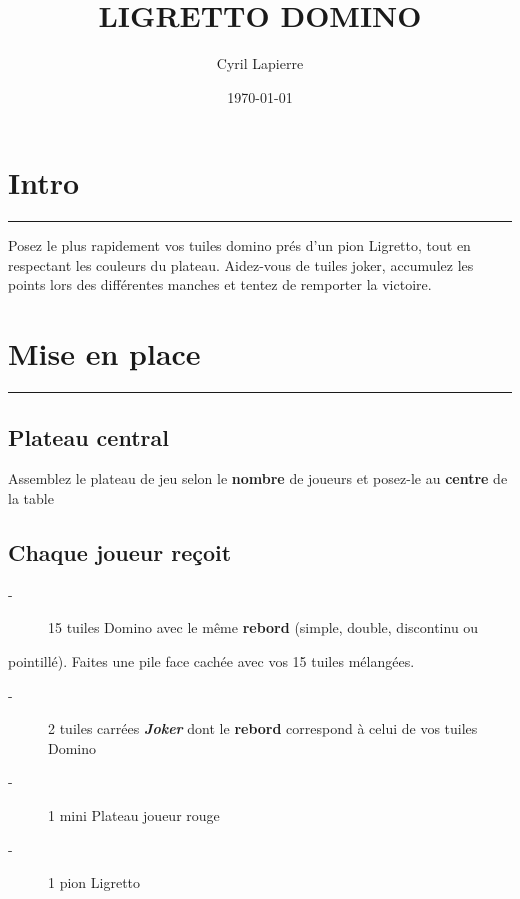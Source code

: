 \documentclass{article}%
\title{LIGRETTO DOMINO}%
\author{Cyril Lapierre}%
\date{\today}%
\begin{document}
%
\normalsize%
\maketitle\thispagestyle{header}%
\pagestyle{header}%
\sectionfont{\color{blue}}%
\subsectionfont{\color{blue}}%
\subsubsectionfont{\color{blue}}%
\section{ Intro
}%
\label{sec:Intro}%
\textcolor{blue}{\rule{18cm}{0.07cm}}\break%
Posez le plus rapidement vos tuiles domino prés d'un pion Ligretto, tout en respectant les couleurs du plateau. Aidez{-}vous de tuiles joker, accumulez les points lors des différentes manches et tentez de remporter la victoire.


%
\sectionfont{\color{mygreen}}%
\subsectionfont{\color{mygreen}}%
\subsubsectionfont{\color{mygreen}}%
\section{ Mise en place
}%
\label{sec:Miseenplace}%
\textcolor{mygreen}{\rule{18cm}{0.07cm}}\break

%
\subsection{ Plateau central
}%
\label{subsec:Plateaucentral}%
Assemblez le plateau de jeu selon le %
\textcolor{mygreen}{%
\textbf{nombre}%
}%
\textit{ }%
 de joueurs et posez{-}le au %
\textcolor{mygreen}{%
\textbf{centre}%
}%
\textit{ }%
 de la table


%
\subsection{ Chaque joueur reçoit
}%
\label{subsec:Chaquejoueurreoit}%
\begin{description}%
\item[{-} ]%
%
 15 tuiles Domino avec le même %
\textcolor{mygreen}{%
\textbf{rebord}%
}%
\textit{ }%
 (simple, double, discontinu ou
%
\end{description}%
pointillé). Faites une pile face cachée avec vos 15 tuiles mélangées.
%
\begin{description}%
\item[{-} ]%
%
 2 tuiles carrées %
\textcolor{mygreen}{\textbf{\textit{Joker}}}%
\textit{ }%
 dont le %
\textcolor{mygreen}{%
\textbf{rebord}%
}%
\textit{ }%
 correspond à celui de vos tuiles Domino
%
\item[{-} ]%
%
 1 mini Plateau joueur rouge
%
\item[{-} ]%
%
 1 pion Ligretto
%
\end{description}
\end{document}
